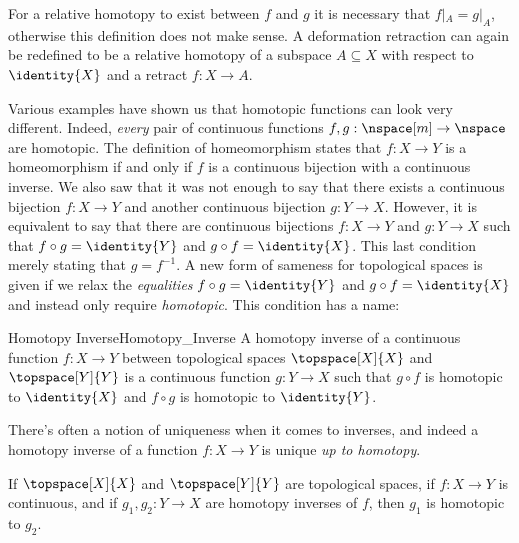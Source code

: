 \documentclass[oneside]{book}                                                  %
\begin{document}
                For a relative homotopy to exist between $f$ and $g$ it is
                necessary that $f|_{A}=g|_{A}$, otherwise this definition does
                not make sense. A deformation retraction can again be redefined
                to be a relative homotopy of a subspace $A\subseteq{X}$ with
                respect to $\identity{X}$ and a retract $f:X\rightarrow{A}$.
                \par\hfill\par
                Various examples have shown us that homotopic functions can look
                very different. Indeed, \textit{every} pair of continuous
                functions $f,g:\nspace[m]\rightarrow\nspace$ are homotopic. The
                definition of homeomorphism states that $f:X\rightarrow{Y}$ is
                a homeomorphism if and only if $f$ is a continuous bijection
                with a continuous inverse. We also saw that it was not enough to
                say that there exists a continuous bijection $f:X\rightarrow{Y}$
                and another continuous bijection $g:Y\rightarrow{X}$. However,
                it is equivalent to say that there are continuous bijections
                $f:X\rightarrow{Y}$ and $g:Y\rightarrow{X}$ such that
                $f\circ{g}=\identity{Y}$ and $g\circ{f}=\identity{X}$. This last
                condition merely stating that $g=f^{\minus{1}}$. A new form of
                sameness for topological spaces is given if we relax the
                \textit{equalities} $f\circ{g}=\identity{Y}$ and
                $g\circ{f}=\identity{X}$ and instead only require
                \textit{homotopic}. This condition has a name:
                \begin{fdefinition}{Homotopy Inverse}{Homotopy_Inverse}
                    A homotopy inverse of a continuous function
                    $f:X\rightarrow{Y}$ between topological spaces
                    $\topspace[X]{X}$ and $\topspace[Y]{Y}$ is a continuous
                    function $g:Y\rightarrow{X}$ such that $g\circ{f}$ is
                    homotopic to $\identity{X}$ and $f\circ{g}$ is homotopic to
                    $\identity{Y}$.
                \end{fdefinition}
                There's often a notion of uniqueness when it comes to inverses,
                and indeed a homotopy inverse of a function $f:X\rightarrow{Y}$
                is unique \textit{up to homotopy}.
                \begin{theorem}
                    If $\topspace[X]{X}$ and $\topspace[Y]{Y}$ are topological
                    spaces, if $f:X\rightarrow{Y}$ is continuous, and if
                    $g_{1},g_{2}:Y\rightarrow{X}$ are homotopy inverses
                    of $f$, then $g_{1}$ is homotopic to ${g}_{2}$.
                \end{theorem}
\end{document}
